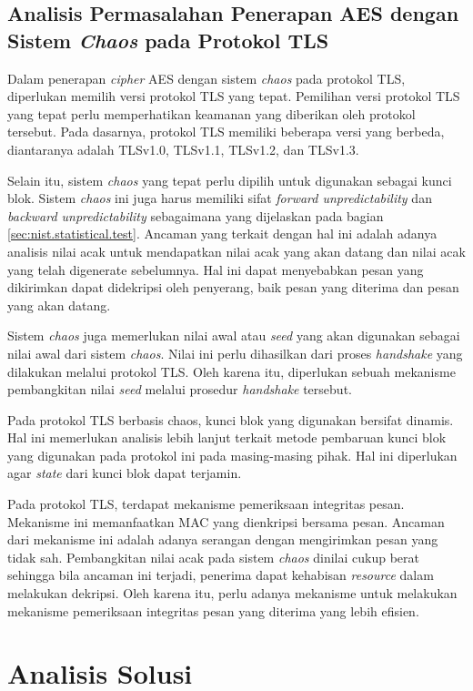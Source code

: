 \subsection{Analisis Permasalahan Penerapan AES dengan Sistem \emph{Chaos} pada Protokol TLS}
\label{sec:ancaman-implementasi}
Dalam penerapan \emph{cipher} AES dengan sistem \emph{chaos} pada protokol TLS, diperlukan memilih versi protokol TLS yang tepat. Pemilihan versi protokol TLS yang tepat perlu memperhatikan keamanan yang diberikan oleh protokol tersebut. Pada dasarnya, protokol TLS memiliki beberapa versi yang berbeda, diantaranya adalah TLSv1.0, TLSv1.1, TLSv1.2, dan TLSv1.3. 

Selain itu, sistem \emph{chaos} yang tepat perlu dipilih untuk digunakan sebagai kunci blok. Sistem \emph{chaos} ini juga harus memiliki sifat \emph{forward unpredictability} dan \emph{backward unpredictability} sebagaimana yang dijelaskan pada bagian \ref{sec:nist.statistical.test}. Ancaman yang terkait dengan hal ini adalah adanya analisis nilai acak untuk mendapatkan nilai acak yang akan datang dan nilai acak yang telah digenerate sebelumnya. Hal ini dapat menyebabkan pesan yang dikirimkan dapat didekripsi oleh penyerang, baik pesan yang diterima dan pesan yang akan datang.

Sistem \emph{chaos} juga memerlukan nilai awal atau \emph{seed} yang akan digunakan sebagai nilai awal dari sistem \emph{chaos}. Nilai ini perlu dihasilkan dari proses \emph{handshake} yang dilakukan melalui protokol TLS. Oleh karena itu, diperlukan sebuah mekanisme pembangkitan nilai \emph{seed} melalui prosedur \emph{handshake} tersebut.

Pada protokol TLS berbasis chaos, kunci blok yang digunakan bersifat dinamis. Hal ini memerlukan analisis lebih lanjut terkait metode pembaruan kunci blok yang digunakan pada protokol ini pada masing-masing pihak. Hal ini diperlukan agar \emph{state} dari kunci blok dapat terjamin.

Pada protokol TLS, terdapat mekanisme pemeriksaan integritas pesan. Mekanisme ini memanfaatkan MAC yang dienkripsi bersama pesan. Ancaman dari mekanisme ini adalah adanya serangan dengan mengirimkan pesan yang tidak sah. Pembangkitan nilai acak pada sistem \emph{chaos} dinilai cukup berat sehingga bila ancaman ini terjadi, penerima dapat kehabisan \emph{resource} dalam melakukan dekripsi. Oleh karena itu, perlu adanya mekanisme untuk melakukan mekanisme pemeriksaan integritas pesan yang diterima yang lebih efisien.

\section{Analisis Solusi}

